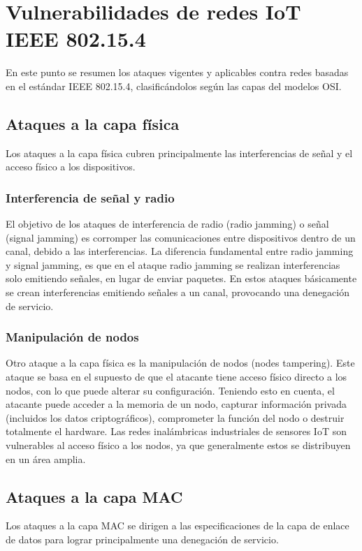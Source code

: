 \chapter{Vulnerabilidades de redes IoT IEEE 802.15.4} %
\label{ataquesredesieee}
En este punto se resumen los ataques vigentes y aplicables contra redes basadas en el estándar IEEE 802.15.4, clasificándolos según las capas del modelos OSI.

\section{Ataques a la capa física} %
Los ataques a la capa física cubren principalmente las interferencias de señal y el acceso físico a los dispositivos.
\subsection{Interferencia de señal y radio}
El objetivo de los ataques de interferencia de radio (radio jamming) o señal (signal jamming) es corromper las comunicaciones entre dispositivos dentro de un canal,  debido a las interferencias. La diferencia fundamental entre radio jamming y signal jamming, es que en el ataque radio jamming se realizan interferencias solo emitiendo señales, en lugar de enviar paquetes. En estos ataques básicamente se crean interferencias emitiendo señales a un canal, provocando una denegación de servicio.
\subsection{Manipulación de nodos}
Otro ataque a la capa física es la manipulación de nodos (nodes tampering). Este ataque se basa en el supuesto de que el atacante tiene acceso físico directo a los nodos, con lo que puede alterar su configuración. Teniendo esto en cuenta, el atacante puede acceder a la memoria de un nodo, capturar información privada (incluidos los datos criptográficos), comprometer la función del nodo o destruir totalmente el hardware. Las redes inalámbricas industriales de sensores IoT son vulnerables al acceso físico a los nodos, ya que generalmente estos se distribuyen en un área amplia.




\section{Ataques a la capa MAC} %
Los ataques a la capa MAC se dirigen a las especiﬁcaciones de la capa de enlace de datos para lograr principalmente una denegación de servicio.
